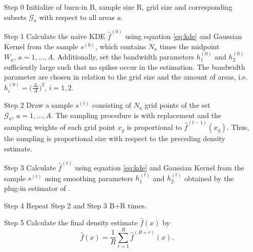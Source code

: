\begin{itemize}
    \item[Step 0] Initialize of burn-in B, sample size R, grid size and corresponding subsets $\mathcal{G}_a$ with respect to all areas $a$.
    \item[Step 1] Calculate the naive KDE $\hat{f}^{(0)}$ using equation \ref{eq:kde} and Gaussian Kernel from the sample $s^{(0)}$, which contains $N_a$ times the midpoint $W_a,\, a = 1,\dots, A$. Additionally, set the bandwidth parameters $h_1^{(0)}$ and $h_2^{(0)}$ sufficiently large such that no spikes occur in the estimation. 
    The bandwidth parameter are chosen in relation to the grid size and the amount of areas, i.e. $h_i^{(0)} = \Big( \frac{\Delta_i}{A} \Big)^2, \, i = 1,2$.  
    \item[Step 2] Draw a sample $s^{(t)}$ consisting of $N_a$ grid points of the set $\mathcal{G}_a,\, a = 1, \dots, A$. The sampling procedure is with replacement and the sampling weights of each grid point $x_g$ is proportional to $\hat{f}^{(t-1)}(x_g)$. Thus, the sampling is proportional size with respect to the preceding density estimate.
    \item[Step 3] Calculate $\hat{f}^{(t)}$ using equation \ref{eq:kde} and Gaussian Kernel from the sample $s^{(t)}$ using smoothing parameters $h_1^{(t)}$ and $h_2^{(t)}$ obtained by the plug-in estimator of \cite{Wand94}. 
    \item[Step 4] Repeat Step 2 and Step 3 B+R times. 
    \item[Step 5] Calculate the final density estimate $\hat{f}(x)$ by
    $$ \hat{f}(x) = \frac{1}{R} \sum_{r = 1}^R \hat{f}^{(B+r)}(x).$$
\end{itemize}

